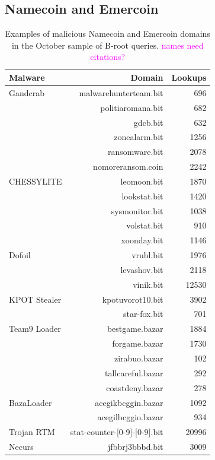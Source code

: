 \documentclass[10pt,sigconf,letterpaper]{acmart}
\newcommand{\randall}{\ding{110}\ding{43}\textcolor{magenta}}
\newcommand{\randall}{}
\begin{document}
\subsection{Namecoin and Emercoin}
\begin{table}
	\begin{tabular}{lrr}
		\toprule
		Malware & Domain & Lookups \\
		\midrule
		Gandcrab	&	malwarehunterteam.bit	&	696	\\
			&	politiaromana.bit	&	682	\\
			&	gdcb.bit	&	632	\\
			&	zonealarm.bit	&	1256	\\
			&	ransomware.bit	&	2078	\\
			&	nomoreransom.coin	&	2242	\\
		CHESSYLITE	&	leomoon.bit	&	1870	\\
			&	lookstat.bit	&	1420	\\
			&	sysmonitor.bit	&	1038	\\
			&	volstat.bit	&	910	\\
			&	xoonday.bit	&	1146	\\
		Dofoil	&	vrubl.bit	&	1976	\\
			&	levashov.bit	&	2118	\\
			&	vinik.bit	&	12530	\\
		KPOT Stealer	&	kpotuvorot10.bit	&	3902	\\
			&	star-fox.bit	&	701	\\
		Team9 Loader	&	bestgame.bazar	&	1884	\\
			&	forgame.bazar	&	1730	\\
			&	zirabuo.bazar	&	102	\\
			&	tallcareful.bazar	&	292	\\
			&	coastdeny.bazar	&	278	\\
		BazaLoader	&	acegikbcggin.bazar	&	1092	\\
			&	acegilbcggio.bazar	&	934	\\
		Trojan RTM	&	stat-counter-[0-9]-[0-9].bit	&	20996	\\
		Necurs	&	jfbbrj3bbbd.bit	&	3009	\\
		\bottomrule
	\end{tabular}
	\caption{Examples of malicious Namecoin and Emercoin domains in the October sample of B-root 
	queries. \randall{names need citations?}}
	\label{tab:namecoin_emercoin}
\end{table}

%
\end{document}
